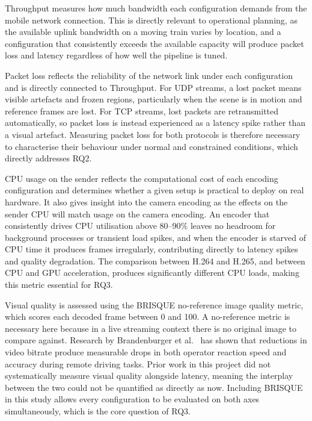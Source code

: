 Throughput measures how much bandwidth each configuration demands from the mobile network connection. This is directly relevant to operational planning, as the available uplink bandwidth on a moving train varies by location, and a configuration that consistently exceeds the available capacity will produce packet loss and latency regardless of how well the pipeline is tuned. 

Packet loss reflects the reliability of the network link under each configuration and is directly connected to Throughput. For UDP streams, a lost packet means visible artefacts and frozen regions, particularly when the scene is in motion and reference frames are lost. For TCP streams, lost packets are retransmitted automatically, so packet loss is instead experienced as a latency spike rather than a visual artefact. Measuring packet loss for both protocols is therefore necessary to characterise their behaviour under normal and constrained conditions, which directly addresses RQ2. 

CPU usage on the sender reflects the computational cost of each encoding configuration and determines whether a given setup is practical to deploy on real hardware. It also gives insight into the camera encoding as the effects on the sender CPU will match usage on the camera encoding. An encoder that consistently drives CPU utilisation above 80--90\% leaves no headroom for background processes or transient load spikes, and when the encoder is starved of CPU time it produces frames irregularly, contributing directly to latency spikes and quality degradation. The comparison between H.264 and H.265, and between CPU and GPU acceleration, produces significantly different CPU loads, making this metric essential for RQ3.

Visual quality is assessed using the BRISQUE no-reference image quality metric, which scores each decoded frame between 0 and 100. A no-reference metric is necessary here because in a live streaming context there is no original image to compare against. Research by Brandenburger et al.~\cite{brandenburger2023} has shown that reductions in video bitrate produce measurable drops in both operator reaction speed and accuracy during remote driving tasks. Prior work in this project did not systematically measure visual quality alongside latency, meaning the interplay between the two could not be quantified as directly as now. Including BRISQUE in this study allows every configuration to be evaluated on both axes simultaneously, which is the core question of RQ3.

